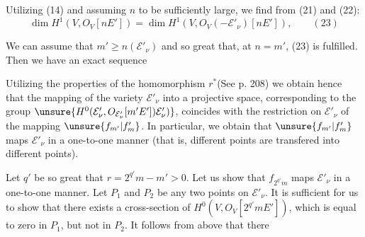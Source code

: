 Utilizing (14) and assuming $n$ to be sufficiently large, we find from (21) and (22):
\[
\dim H^1(V,O_V[nE'])=\dim H^1(V,O_V(-\mathcal E'_\nu)[nE']),\qquad (23)
\]

We can assume that $m'\ge n(\mathcal E'_\nu)$ and so great that, at $n=m'$, (23) is fulfilled. Then we have an exact sequence

Utilizing the properties of the homomorphism $r^*$(See p. 208) we obtain hence that the mapping of the variety $\mathcal E'_\nu$ into a projective space, corresponding to the group $\unsure{H^0(\mathcal E'_\nu,O_{\mathcal E'_\nu}[m'E'])\mathcal E'_\nu)}$, coincides with the restriction on $\mathcal E'_\nu$ of the mapping $\unsure{f_{m'}|f_m'}$. In particular, we obtain that $\unsure{f_{m'}|f_m'}$ maps $\mathcal E'_\nu$ in a one-to-one manner (that is, different points are transfered into different points).

Let $q'$ be so great that $r=2^{q'}m-m'>0$. Let us show that $f_{2^{q'}m}$ maps $\mathcal E'_\nu$ in a one-to-one manner. Let $P_1$ and $P_2$ be any two points on $\mathcal E'_\nu$. It is sufficient for us to show that there exists a cross-section of $H^0(V,O_V[2^{q'}mE'])$, which is equal to zero in $P_1$, but not in $P_2$. It follows from above that there
